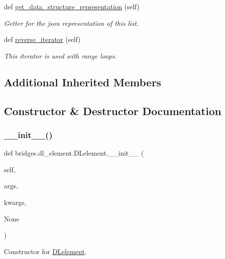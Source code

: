 \begin{DoxyCompactItemize}
def \hyperlink{classbridges_1_1dl__element_1_1_d_lelement_abcae653ca8e9590c594910bad148ddf2}{get\+\_\+data\+\_\+structure\+\_\+representation} (self)
\begin{DoxyCompactList}\small\item\em Getter for the json representation of this list. \end{DoxyCompactList}\item 
def \hyperlink{classbridges_1_1dl__element_1_1_d_lelement_a2baa040819283ef3adcda70b630de421}{reverse\+\_\+iterator} (self)
\begin{DoxyCompactList}\small\item\em This iterator is used with range loops. \end{DoxyCompactList}\end{DoxyCompactItemize}
\subsection*{Additional Inherited Members}


\subsection{Constructor \& Destructor Documentation}
\mbox{\label{classbridges_1_1dl__element_1_1_d_lelement_a54256a7be5796b0471cb2655dd971bd5}} 
\subsubsection{\texorpdfstring{\+\_\+\+\_\+init\+\_\+\+\_\+()}{\_\_init\_\_()}}
{\footnotesize\ttfamily def bridges.\+dl\+\_\+element.\+D\+Lelement.\+\_\+\+\_\+init\+\_\+\+\_\+ (\begin{DoxyParamCaption}\item[{}]{self,  }\item[{}]{args,  }\item[{}]{kwargs,  }\item[{}]{None }\end{DoxyParamCaption})}



Constructor for \hyperlink{classbridges_1_1dl__element_1_1_d_lelement}{D\+Lelement}. 

